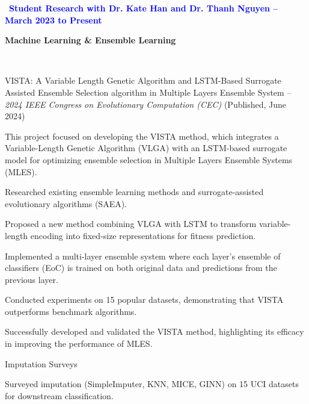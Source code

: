 
\newcommand{\cvgroupheader}[2]{%
  \vspace{0.6em}%
  \noindent
  \colorbox{black!5}{%
    \parbox{\dimexpr\linewidth-2\fboxsep\relax}{%
      {\colorbox{blue!10}{\strut\ \textcolor{blue}{\footnotesize\textbf{#2}}\ }}\hspace{0.8em}%
      {\large\textbf{#1}}%
    }%
  }\\[-0.2em]
}

\cvgroupheader{Machine Learning \& Ensemble Learning}{Student Research with Dr. Kate Han and Dr. Thanh Nguyen -- March 2023 to Present}
\begin{cventries}

  \cventry
    {VISTA: A Variable Length Genetic Algorithm and LSTM-Based Surrogate Assisted Ensemble Selection algorithm in Multiple Layers Ensemble System -- \emph{2024 IEEE Congress on Evolutionary Computation (CEC)} (Published, June 2024)}
    {}
    {
      \begin{cvitems}
        \item {This project focused on developing the VISTA method, which integrates a Variable-Length Genetic Algorithm (VLGA) with an LSTM-based surrogate model for optimizing ensemble selection in Multiple Layers Ensemble Systems (MLES).}
        \item {Researched existing ensemble learning methods and surrogate-assisted evolutionary algorithms (SAEA).}
        \item {Proposed a new method combining VLGA with LSTM to transform variable-length encoding into fixed-size representations for fitness prediction.}
        \item {Implemented a multi-layer ensemble system where each layer's ensemble of classifiers (EoC) is trained on both original data and predictions from the previous layer.}
        \item {Conducted experiments on 15 popular datasets, demonstrating that VISTA outperforms benchmark algorithms.}
        \item {Successfully developed and validated the VISTA method, highlighting its efficacy in improving the performance of MLES.}
      \end{cvitems}
    }

\vspace{8pt}

  \cventry
    {Imputation Surveys}
    {}
    {
      \begin{cvitems}
        \item {Surveyed imputation (SimpleImputer, KNN, MICE, GINN) on 15 UCI datasets for downstream classification.}
      \end{cvitems}
    }

\end{cventries}

